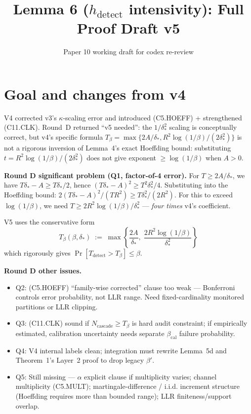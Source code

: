 \documentclass{article}
\title{Lemma 6 ($h_{\mathrm{detect}}$ intensivity): Full Proof Draft v5}
\author{Paper 10 working draft for codex re-review}
\date{}
\newcommand{\deltastar}{\delta_{*}}
\newcommand{\Tbeta}{T_{\beta}}
\newcommand{\Ncasc}{N_{\mathrm{cascade}}}
\newcommand{\bcal}{\beta_{\mathrm{cal}}}
\begin{document}
\maketitle

\section{Goal and changes from v4}

V4 corrected v3's $\kappa$-scaling error and introduced (C5.HOEFF)
+ strengthened (C11.CLK).  Round~D returned ``v5 needed'': the
$1/\deltastar^2$ scaling is conceptually correct, but v4's
specific formula
$\Tbeta = \max\{2A/\deltastar, R^2\log(1/\beta)/(2\deltastar^2)\}$
is not a rigorous inversion of Lemma~4's exact Hoeffding bound:
substituting $t = R^2\log(1/\beta)/(2\deltastar^2)$ does not give
exponent $\geq \log(1/\beta)$ when $A > 0$.

\textbf{Round D significant problem (Q1, factor-of-4 error).}
For $T \geq 2A/\deltastar$, we have $T\deltastar - A \geq
T\deltastar/2$, hence $(T\deltastar - A)^2 \geq T^2\deltastar^2/4$.
Substituting into the Hoeffding bound:
$2(T\deltastar - A)^2/(TR^2) \geq T\deltastar^2/(2R^2)$.
For this to exceed $\log(1/\beta)$, we need $T \geq 2R^2\log(1/\beta)/
\deltastar^2$ — \emph{four times} v4's coefficient.

V5 uses the conservative form
\[
  \Tbeta(\beta, \deltastar) \;:=\; \max\!\left\{
  \frac{2A}{\deltastar},\;
  \frac{2 R^2 \log(1/\beta)}{\deltastar^2}\right\}
\]
which rigorously gives $\Pr[T_{\mathrm{detect}} > \Tbeta] \leq
\beta$.

\textbf{Round D other issues.}
\begin{itemize}
\item Q2: (C5.HOEFF) ``family-wise corrected'' clause too weak —
  Bonferroni controls error probability, not LLR range. Need
  fixed-cardinality monitored partitions or LLR clipping.
\item Q3: (C11.CLK) sound if $\Ncasc \geq \Tbeta$ is hard audit
  constraint; if empirically estimated, calibration uncertainty
  needs separate $\bcal$ failure probability.
\item Q4: V4 internal labels clean; integration must rewrite
  Lemma~5d and Theorem~1's Layer~2 proof to drop legacy $\beta'$.
\item Q5: Still missing — $\alpha$ explicit clause if multiplicity
  varies; channel multiplicity (C5.MULT); martingale-difference /
  i.i.d. increment structure (Hoeffding requires more than bounded
  range); LLR finiteness/support overlap.
\end{itemize}
\end{document}
